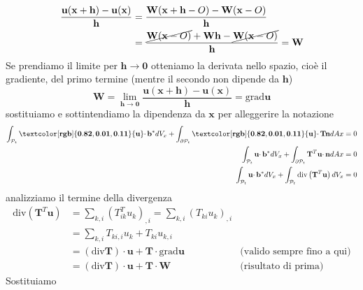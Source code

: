 \documentclass[10pt,a4paper,twoside]{book}
\begin{document}
\begin{align*}
\frac{\mathbf{u}(\mathbf{x} +\mathbf{h}) -\mathbf{u}(\mathbf{x})}{\mathbf{h}} & =\frac{\mathbf{W}(\mathbf{x} +\mathbf{h} -O) -\mathbf{W}(\mathbf{x} -O)}{\mathbf{h}}\\
 & =\frac{\cancel{\mathbf{W}(\mathbf{x} -O)} +\mathbf{Wh} -\cancel{\mathbf{W}(\mathbf{x} -O)}}{\mathbf{h}} =\mathbf{W}
\end{align*}
Se prendiamo il limite per $\mathbf{h}\rightarrow \mathbf{0}$ otteniamo la derivata nello spazio, cioè il gradiente, del primo termine (mentre il secondo non dipende da $\mathbf{h}$)
\begin{equation*}
\mathbf{W} =\lim\limits _{\mathbf{h}\rightarrow \mathbf{0}}\frac{\mathbf{u}(\mathbf{x} +\mathbf{h}) -\mathbf{u}(\mathbf{x})}{\mathbf{h}} =\mathrm{grad}\mathbf{u}
\end{equation*}
sostituiamo e sottintendiamo la dipendenza da $\mathbf{x}$ per alleggerire la notazione
\begin{align*}
\int _{\mathcal{P}_{t}}\mathbf{\textcolor[rgb]{0.82,0.01,0.11}{u}} \cdotp \mathbf{b}^{*} dV_{x} +\int _{\partial \mathcal{P}_{t}}\mathbf{\textcolor[rgb]{0.82,0.01,0.11}{u}} \cdotp \mathbf{Tn} dAx & =0\\
\int _{\mathcal{P}_{t}}\mathbf{u} \cdotp \mathbf{b}^{*} dV_{x} +\int _{\partial \mathcal{P}_{t}}\mathbf{T}^{T}\mathbf{u} \cdotp \mathbf{n} dAx & =0\\
\int _{\mathcal{P}_{t}}\mathbf{u} \cdotp \mathbf{b}^{*} dV_{x} +\int _{\mathcal{P}_{t}}\mathrm{div}\left(\mathbf{T}^{T}\mathbf{u}\right) dV_{x} & =0
\end{align*}
analizziamo il termine della divergenza
\begin{equation*}
\begin{aligned}
\mathrm{div}\left(\mathbf{T}^{T}\mathbf{u}\right) & =\sum _{k,i}\left( T^{T}_{ik} u_{k}\right)_{,i} =\sum _{k,i}( T_{ki} u_{k})_{,i} & \\
 & =\sum _{k,i} T_{ki,i} u_{k} +T_{ki} u_{k,i} & \\
 & =(\mathrm{div}\mathbf{T}) \cdotp \mathbf{u} +\mathbf{T} \cdotp \mathrm{grad}\mathbf{u} & \text{(valido sempre fino a qui)}\\
 & =(\mathrm{div}\mathbf{T}) \cdotp \mathbf{u} +\mathbf{T} \cdotp \mathbf{W} & \text{(risultato di prima)}
\end{aligned}
\end{equation*}
Sostituiamo
\end{document}

